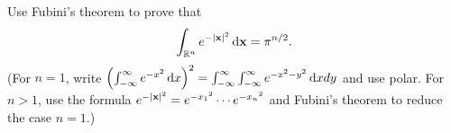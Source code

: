 \begin{problem}
  Use Fubini's theorem to prove that
  \[
    \int_{\mathbb{R}^n}e^{-|\mathbf{x}|^2}\mathop{}\!\mathrm{d}\mathbf{x}=\pi^{n/2}.
  \]
  (For $n=1$, write
  $\left(\int_{-\infty}^\infty e^{-x^2}\mathop{}\!\mathrm{d}
    x\right)^2=\int_{-\infty}^\infty\int_{-\infty}^\infty e^{-x^2-y^2}\mathop{}\!\mathrm{d}
  xdy$ and use polar. For $n>1$, use the formula
  $e^{-|\mathbf{x}|^2}=e^{-{x_1}^2}\cdots e^{-{x_n}^2}$ and Fubini's theorem to
  reduce the case $n=1$.)
\end{problem}
\begin{solution}
\end{solution}

